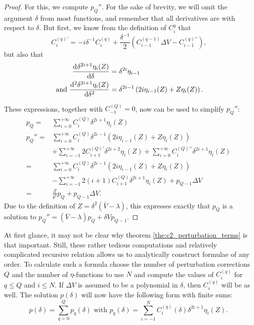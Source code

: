 \begin{proof}
    For this, we compute $p_Q''$. For the sake of brevity, we will omit the argument $\delta$ from most functions, and remember that all derivatives are with respect to $\delta$. But first, we know from the definition of $C_i^q$ that
    $$
        C_i^{(q)\prime} = -i \delta^{-1} C_i^{(q)} + \frac{\delta^{-1}}{2}\left(C^{(q-1)}_{i-1}\Delta V - C^{(q)\prime\prime}_{i-1}\right)\text{,}
    $$
    but also that
    \begin{align*}
        {\dv[]{\delta^{2i+1}\eta_i(Z)}{\delta}}               & = \delta^{2i} \eta_{i-1}                                         \\
        \text{ and } {\dv[2]{\delta^{2i+1}\eta_i(Z)}{\delta}} & = \delta^{2i-1}\left(2i\eta_{i-1}(Z) + Z\eta_i(Z)\right)\text{.}
    \end{align*}

    \begingroup
    \allowdisplaybreaks
    These expressions, together with $C_{-1}^{(Q)} = 0$, now can be used to simplify $p_Q''$:
    \begin{align*}
        p_Q =   & \sum_{i=0}^{+\infty} C_{i}^{(Q)} \delta^{2i + 1} \eta_{i}(Z)                                                                              \\
        p_Q'' = & \sum_{i=0}^{+\infty} C_i^{(Q)}\delta^{2i-1}\left(2i\eta_{i-1}(Z) + Z\eta_i(Z)\right)                                                      \\
                & + \sum_{i=-1}^{+\infty} 2C_{i+1}^{(Q)\prime}\delta^{2i+2}\eta_{i}(Z) + \sum_{i=0}^{+\infty} C_i^{(Q)\prime\prime}\delta^{2i+1}\eta_{i}(Z) \\
        =       & \sum_{i=0}^{+\infty} C_i^{(Q)}\delta^{2i-1}\left(2i\eta_{i-1}(Z) + Z\eta_i(Z)\right)                                                      \\
                & - \sum_{i=-1}^{+\infty} 2(i+1)C_{i+1}^{(Q)}\delta^{2i+1}\eta_{i}(Z) + p_{Q-1} \Delta V                                                    \\
        =       & \frac{Z}{\delta^2}p_Q + p_{Q-1} \Delta V \text{.}
    \end{align*}
    \endgroup
    Due to the definition of $Z = \delta^2(\bar{V} - \lambda)$, this expresses exactly that $p_Q$ is a solution to $p_Q'' = (\bar{V} - \lambda)p_Q + \delta V p_{Q-1}$.
\end{proof}

At first glance, it may not be clear why theorem \ref{the:c2_perturbation_terms} is that important. Still, these rather tedious computations and relatively complicated recursive relation allows us to analytically construct formulae of any order. To calculate such a formula choose the number of perturbation corrections $Q$ and the number of $\eta$-functions to use $N$ and compute the values of $C_{i}^{(q)}$ for $q \leq Q$ and $i \leq N$. If $\Delta V$ is assumed to be a polynomial in $\delta$, then $C_{i}^{(q)}$ will be as well. The solution $p(\delta)$ will now have the following form with finite sums:
$$
    p(\delta) = \sum_{q=0}^{Q} p_q(\delta) \text{ with } p_q(\delta) = \sum_{i=-1}^{N} C_{i}^{(q)}(\delta) \delta^{2i+1} \eta_i(Z) \text{.}
$$

